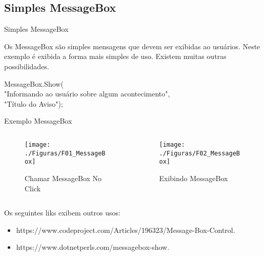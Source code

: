	\subsection{Simples MessageBox}

	\begin{frame}

	\begin{CaixaModelo01}{Simples MessageBox}
						
Os MessageBox são simples mensagens que devem ser exibidas ao usuários.
Neste exemplo é exibida a forma mais simples de uso. Existem muitas outras possibilidades.


	\end{CaixaModelo01}

\begin{tcolorbox}[width=\textwidth,right=2cm]
	MessageBox.Show(\\
	"Informando ao usuário sobre algum acontecimento", \\
	"Título do Aviso");
\end{tcolorbox}

	\end{frame}

	\begin{frame}

\begin{CaixaModelo01}{Exemplo MessageBox}
		
	\begin{columns}
		\begin{column}{0.48\textwidth}
			\begin{figure}
				\texttt{[image: ./Figuras/F01\_MessageBox]}
				\caption{Chamar MessageBox No Click}
				\label{fig:MessageBox01}
			\end{figure}
		\end{column}
		\begin{column}{0.48\textwidth}
			\begin{figure}
				\texttt{[image: ./Figuras/F02\_MessageBox]}
				\caption{Exibindo MessageBox}
				\label{fig:MessageBox02}
			\end{figure}
		\end{column}
	\end{columns}	
\end{CaixaModelo01}

	Os seguintes liks exibem outros usos:
\begin{itemize}
	\item https://www.codeproject.com/Articles/196323/Message-Box-Control.
	\item https://www.dotnetperls.com/messagebox-show.
\end{itemize}






\end{frame}
